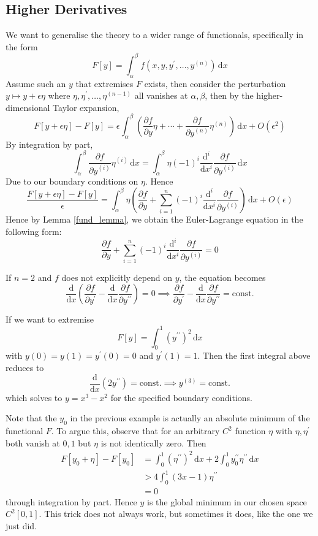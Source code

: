 \subsection{Higher Derivatives}
We want to generalise the theory to a wider range of functionals, specifically in the form
$$F[y]=\int_\alpha^\beta f(x,y,y^\prime,\ldots,y^{(n)})\,\mathrm dx$$
Assume such an $y$ that extremises $F$ exists, then consider the perturbation $y\mapsto y+\epsilon\eta$ where $\eta,\eta^\prime,\ldots,\eta^{(n-1)}$ all vanishes at $\alpha,\beta$, then by the higher-dimensional Taylor expansion,
$$F[y+\epsilon\eta]-F[y]=\epsilon\int_\alpha^\beta\left( \frac{\partial f}{\partial y}\eta+\cdots +\frac{\partial f}{\partial y^{(n)}}\eta^{(n)} \right)\,\mathrm dx+O(\epsilon^2)$$
By integration by part,
$$\int_\alpha^\beta\frac{\partial f}{\partial y^{(i)}}\eta^{(i)}\,\mathrm dx=\int_\alpha^\beta\eta(-1)^i\frac{\mathrm d^i}{\mathrm dx^i}\frac{\partial f}{\partial y^{(i)}}\,\mathrm dx$$
Due to our boundary conditions on $\eta$.
Hence
$$\frac{F[y+\epsilon\eta]-F[y]}{\epsilon}=\int_\alpha^\beta \eta\left(\frac{\partial f}{\partial y}+\sum_{i=1}^n(-1)^i\frac{\mathrm d^i}{\mathrm dx^i}\frac{\partial f}{\partial y^{(i)}}\right)\,\mathrm dx+O(\epsilon)$$
Hence by Lemma \ref{fund_lemma}, we obtain the Euler-Lagrange equation in the following form:
$$\frac{\partial f}{\partial y}+\sum_{i=1}^n(-1)^i\frac{\mathrm d^i}{\mathrm dx^i}\frac{\partial f}{\partial y^{(i)}}=0$$
\begin{example}
    If $n=2$ and $f$ does not explicitly depend on $y$, the equation becomes
    $$\frac{\mathrm d}{\mathrm dx}\left( \frac{\partial f}{\partial y^\prime}-\frac{\mathrm d}{\mathrm dx}\frac{\partial f}{\partial y^{\prime\prime}} \right)=0\implies \frac{\partial f}{\partial y^\prime}-\frac{\mathrm d}{\mathrm dx}\frac{\partial f}{\partial y^{\prime\prime}}=\text{const.}$$
\end{example}
\begin{example}
    If we want to extremise
    $$F[y]=\int_0^1(y^{\prime\prime})^2\,\mathrm dx$$
    with $y(0)=y(1)=y^\prime(0)=0$ and $y^\prime(1)=1$.
    Then the first integral above reduces to
    $$\frac{\mathrm d}{\mathrm dx}(2y^{\prime\prime})=\text{const.}\implies y^{(3)}=\text{const.}$$
    which solves to $y=x^3-x^2$ for the specified boundary conditions.
\end{example}
Note that the $y_0$ in the previous example is actually an absolute minimum of the functional $F$.
To argue this, observe that for an arbitrary $C^2$ function $\eta$ with $\eta,\eta^\prime$ both vanish at $0,1$ but $\eta$ is not identically zero.
Then
\begin{align*}
    F[y_0+\eta]-F[y_0]&=\int_0^1(\eta^{\prime\prime})^2\,\mathrm dx+2\int_0^1 y_0^{\prime\prime}\eta^{\prime\prime}\,\mathrm dx\\
    &>4\int_0^1(3x-1)\eta^{\prime\prime}\\
    &=0
\end{align*}
through integration by part.
Hence $y$ is the global minimum in our chosen space $C^2[0,1]$.
This trick does not always work, but sometimes it does, like the one we just did.